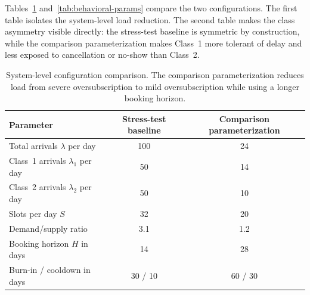 \documentclass[11pt]{article}
\begin{document}
Tables~\ref{tab:system-params} and~\ref{tab:behavioral-params} compare the two
configurations. The first table isolates the system-level load reduction. The
second table makes the class asymmetry visible directly: the stress-test
baseline is symmetric by construction, while the comparison parameterization
makes Class~1 more tolerant of delay and less exposed to cancellation or
no-show than Class~2.

\begin{table}[H]
\centering
\renewcommand{\arraystretch}{1.15}
\small
\begin{tabularx}{0.86\textwidth}{>{\raggedright\arraybackslash}Xcc}
\toprule
Parameter & Stress-test baseline & Comparison parameterization \\
\midrule
Total arrivals $\lambda$ per day & 100 & 24 \\
Class~1 arrivals $\lambda_1$ per day & 50 & 14 \\
Class~2 arrivals $\lambda_2$ per day & 50 & 10 \\
Slots per day $S$ & 32 & 20 \\
Demand/supply ratio & 3.1 & 1.2 \\
Booking horizon $H$ in days & 14 & 28 \\
Burn-in / cooldown in days & 30 / 10 & 60 / 30 \\
\bottomrule
\end{tabularx}
\caption{System-level configuration comparison. The comparison parameterization
reduces load from severe oversubscription to mild oversubscription while using a
longer booking horizon.}
\label{tab:system-params}
\end{table}

\begin{table}[H]
\centering
\renewcommand{\arraystretch}{1.15}
\small
{}
\caption{Class-specific behavioral parameters. The stress-test baseline is
symmetric across classes. The comparison parameterization is asymmetric: Class~1
has greater delay tolerance and lower post-booking loss risk than Class~2.}
\label{tab:behavioral-params}
\end{table}
\end{document}
